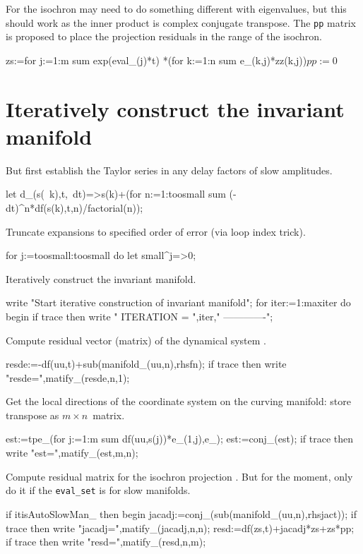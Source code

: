 \documentclass[11pt,a5paper]{article}
\begin{document}
For the isochron may need to do something different with
eigenvalues, but this should work as the inner product is
complex conjugate transpose. The \verb|pp| matrix is
proposed to place the projection residuals in the range of
the isochron. 
\begin{reduce}
zs:=for j:=1:m sum exp(eval_(j)*t)
  *(for k:=1:n sum e_(k,j)*zz(k,j))$
pp:=0$
\end{reduce}




\section{Iteratively construct the invariant manifold}

But first establish the Taylor series in any delay factors
of slow amplitudes.
\begin{reduce}
let d_(s(~k),t,~dt)=>s(k)+(for n:=1:toosmall sum 
        (-dt)^n*df(s(k),t,n)/factorial(n));
\end{reduce}

Truncate expansions to specified order of error (via loop
index trick).
\begin{reduce}
for j:=toosmall:toosmall do let small^j=>0;
\end{reduce}

Iteratively construct the invariant manifold.
\begin{reduce}
write "Start iterative construction of invariant manifold";
for iter:=1:maxiter do begin
if trace then write "
ITERATION = ",iter,"
-------------";
\end{reduce}

Compute residual vector (matrix) of the dynamical system
\cite{Roberts96a}.
\begin{reduce}
resde:=-df(uu,t)+sub(manifold_(uu,n),rhsfn);
if trace then write "resde=",matify_(resde,n,1);
\end{reduce}

Get the local directions of the coordinate system on the
curving manifold: store transpose as \(m\times n\)~matrix.
\begin{reduce}
est:=tpe_(for j:=1:m sum df(uu,s(j))*e_(1,j),e_);
est:=conj_(est);
if trace then write "est=",matify_(est,m,n);
\end{reduce}

Compute residual matrix for the isochron projection
\cite{Roberts89b, Roberts97b}. But for the moment, only do
it if the \verb|eval_set| is for slow manifolds.
\begin{reduce}
if itisAutoSlowMan_ then begin
    jacadj:=conj_(sub(manifold_(uu,n),rhsjact));
    if trace then write "jacadj=",matify_(jacadj,n,n);
    resd:=df(zs,t)+jacadj*zs+zs*pp;
    if trace then write "resd=",matify_(resd,n,m);
\end{reduce}
\end{document}

